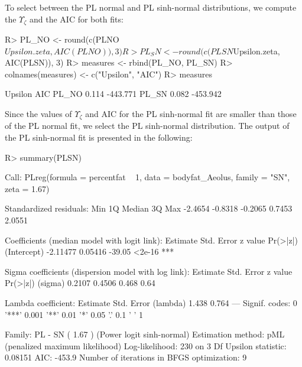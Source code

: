 To select between the PL normal and PL sinh-normal distributions, we compute the $\Upsilon_\zeta$ and the AIC for both fits:
\begin{Schunk}
\begin{Sinput}
R> PL_NO <- round(c(PLNO$Upsilon.zeta, AIC(PLNO)), 3)
R> PL_SN <- round(c(PLSN$Upsilon.zeta, AIC(PLSN)), 3)
R> measures <- rbind(PL_NO, PL_SN)
R> colnames(measures) <- c("Upsilon", "AIC")
R> measures
\end{Sinput}
\begin{Soutput}
      Upsilon      AIC
PL_NO   0.114 -443.771
PL_SN   0.082 -453.942
\end{Soutput}
\end{Schunk}

Since the values of $\Upsilon_\zeta$ and AIC for the PL sinh-normal fit are smaller than those of the PL normal fit, we select the PL sinh-normal distribution. The  output of the PL sinh-normal fit is presented in the following:
\begin{Schunk}
\begin{Sinput}
R> summary(PLSN)
\end{Sinput}
\begin{Soutput}
Call:
PLreg(formula = percentfat ~ 1, data = bodyfat_Aeolus, family = "SN", 
    zeta = 1.67)

Standardized residuals:
    Min      1Q  Median      3Q     Max 
-2.4654 -0.8318 -0.2065  0.7453  2.0551 

Coefficients (median model with logit link):
            Estimate Std. Error z value Pr(>|z|)    
(Intercept) -2.11477    0.05416  -39.05   <2e-16 ***

Sigma coefficients (dispersion model with log link):
        Estimate Std. Error z value Pr(>|z|)
(sigma)   0.2107     0.4506   0.468     0.64

Lambda coefficient:
         Estimate Std. Error
(lambda)    1.438      0.764
---
Signif. codes:  0 '***' 0.001 '**' 0.01 '*' 0.05 '.' 0.1 ' ' 1 

Family: PL - SN ( 1.67 ) (Power logit sinh-normal)
Estimation method: pML (penalized maximum likelihood)
Log-likelihood:   230 on 3 Df
Upsilon statistic: 0.08151
AIC: -453.9
Number of iterations in BFGS optimization: 9 
\end{Soutput}
\end{Schunk}

